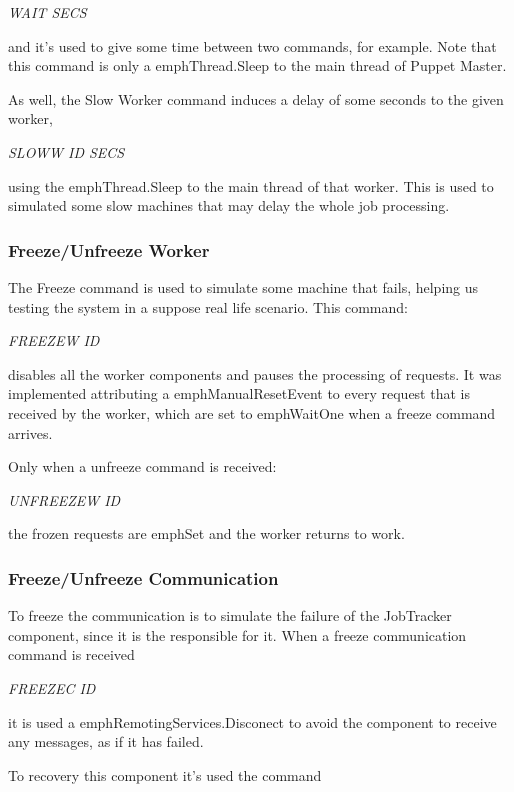 \documentclass[times, 10pt,twocolumn]{article}
\begin{document}
            \emph{WAIT SECS}
            
            and it's used to give some time between two commands, for example. Note that this command is only a emph{Thread.Sleep} to the main thread of Puppet Master. 
            
            As well, the Slow Worker command induces a delay of some seconds to the given worker, 
            
            \emph{SLOWW ID SECS}
            
			using the emph{Thread.Sleep} to the main thread of that worker. This is used to simulated some slow machines that may delay the whole job processing.
            
            \subsubsection{Freeze/Unfreeze Worker} \label{freeze}
            The Freeze command is used to simulate some machine that fails, helping us testing the system in a suppose real life scenario. This command: 
            
            \emph{FREEZEW ID}
            
            disables all the worker components and pauses the processing of requests.
            It was implemented attributing a emph{ManualResetEvent} to every request that is received by the worker, which are set to emph{WaitOne} when a freeze command arrives.
            
            Only when a unfreeze command is received:
            
            \emph{UNFREEZEW ID}
            
            the frozen requests are emph{Set} and the worker returns to work.

            \subsubsection{Freeze/Unfreeze Communication}
            To freeze the communication is to simulate the failure of the JobTracker component, since it is the responsible for it. When a freeze communication command is received
            
	        \emph{FREEZEC ID}
	        
	        it is used a emph{RemotingServices.Disconect} to avoid the component to receive any messages, as if it has failed.
	        
	        To recovery this component it's used the command
	        
\end{document}
